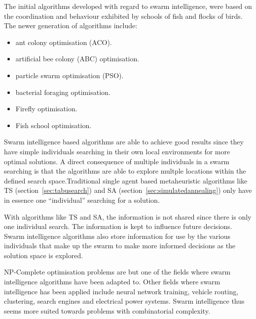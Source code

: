 The initial algorithms developed with regard to swarm intelligence, were based on the coordination and behaviour exhibited by schools of fish and flocks of birds. The newer generation of algorithms include\cite{SwarmArt,ChaoticSwarmIntel,BeeJobShop}:
\begin{itemize}
\item ant colony optimisation (ACO)\cite{SwarmArt}.
\item artificial bee colony (ABC) optimisation\cite{BeeJobShop}.
\item particle swarm optimisation (PSO)\cite{ChaoticSwarmIntel}. 
\item bacterial foraging optimisation\cite{CompuIntelligenceIntro}.
\item Firefly optimisation\cite{CompuIntelligenceIntro}.
\item Fish school optimisation\cite{CompuIntelligenceIntro}.
\end{itemize}


Swarm intelligence based algorithms are able to achieve good results since they have simple individuals searching in their own local environments for more optimal solutions\cite{CompuIntelligenceIntro,FundamentalSwarm}. A direct consequence of multiple individuals in a swarm searching is that the algorithms are able to explore multple locations within the defined search space\cite{CompuIntelligenceIntro,FundamentalSwarm}.Traditional single agent based metaheuristic algorithms like TS (section~\ref{sec:tabusearch}) and SA (section~\ref{sec:simulatedannealing}) only have in essence one ``individual'' searching for a solution\cite{CompuIntelligenceIntro,FundamentalSwarm}. 

With algorithms like TS and SA, the information is not shared since there is only one individual search\cite{CompuIntelligenceIntro,FundamentalSwarm,SASingleMultiObj,TSHazardous}. The information is kept to influence future decisions\cite{AIModernApproach,TabuMontemanniSmith,TabuVechicleRoutingWithTimeWindows,CurveFittingSA,EcoEquilSA}. Swarm intelligence algorithms also store information for use by the various individuals that make up the swarm to make more informed decisions as the solution space is explored\cite{CompuIntelligenceIntro,FundamentalSwarm}.

NP-Complete optimisation problems are but one of the fields where swarm intelligence algorithms have been adapted to. Other fields where swarm intelligence has been applied include neural network training\cite{CompuIntelligenceIntro}, vehicle routing\cite{ACOSurvey}, clustering\cite{AntSwarmClustering}, search engines and electrical power systems\cite{SAElectricPower}. Swarm intelligence thus seems more suited towards problems with combinatorial complexity\cite{SIOPDenby}.

